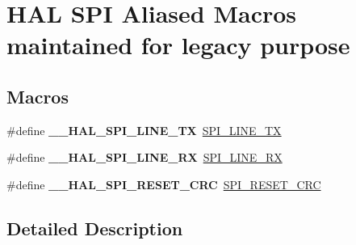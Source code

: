 \hypertarget{group___h_a_l___s_p_i___aliased___macros}{}\section{H\+AL S\+PI Aliased Macros maintained for legacy purpose}
\label{group___h_a_l___s_p_i___aliased___macros}
\subsection*{Macros}
\begin{DoxyCompactItemize}
\item 
\mbox{\label{group___h_a_l___s_p_i___aliased___macros_gab21df59cf07dc6839768a4aed3219801}} 
\#define {\bfseries \+\_\+\+\_\+\+H\+A\+L\+\_\+\+S\+P\+I\+\_\+L\+I\+N\+E\+\_\+\+TX}~\hyperlink{group___s_p_i___private___macros_gae3b2eb5e818e58b66474d42dedac5523}{S\+P\+I\+\_\+L\+I\+N\+E\+\_\+\+TX}
\item 
\mbox{\label{group___h_a_l___s_p_i___aliased___macros_ga34ee4bd3329208207be8fca1f2b6e614}} 
\#define {\bfseries \+\_\+\+\_\+\+H\+A\+L\+\_\+\+S\+P\+I\+\_\+L\+I\+N\+E\+\_\+\+RX}~\hyperlink{group___s_p_i___private___macros_gaa8d58cef91c1874d5a4dde4014cf6269}{S\+P\+I\+\_\+L\+I\+N\+E\+\_\+\+RX}
\item 
\mbox{\label{group___h_a_l___s_p_i___aliased___macros_gaf58ad00b4183d30205773445099d066b}} 
\#define {\bfseries \+\_\+\+\_\+\+H\+A\+L\+\_\+\+S\+P\+I\+\_\+\+R\+E\+S\+E\+T\+\_\+\+C\+RC}~\hyperlink{group___s_p_i___private___macros_gab120a0085b72939e7d19c4f6b3381a99}{S\+P\+I\+\_\+\+R\+E\+S\+E\+T\+\_\+\+C\+RC}
\end{DoxyCompactItemize}


\subsection{Detailed Description}
